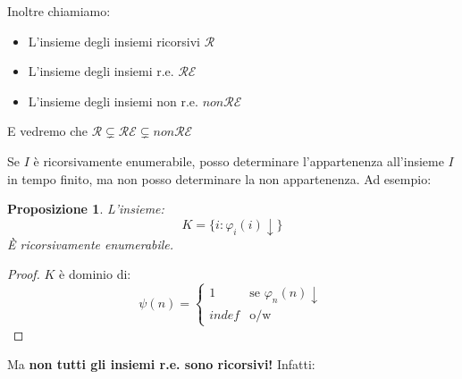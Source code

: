 \documentclass[a4paper,10pt,oneside]{article}
\theoremstyle{break}
\newtheorem{prop}{Proposizione}[subsection]
\newcommand{\RE}{\mathcal {RE}}
\newcommand{\R}{\mathcal {R}}
\begin{document}
Inoltre chiamiamo:
\begin{multicols}{2}

\begin{itemize}
 \item L'insieme degli insiemi ricorsivi $\R$
 \item L'insieme degli insiemi r.e. $\RE$
 \item L'insieme degli insiemi non r.e. $non\RE$
\end{itemize}
E vedremo che $\R \subsetneq \RE \subsetneq non\RE$
\end{multicols}


Se $I$ è ricorsivamente enumerabile, posso determinare l'appartenenza all'insieme $I$ in tempo finito, ma non posso determinare la non appartenenza. Ad esempio:
\begin{mdframed}

\begin{prop}
\label{K}
L'insieme:
\[ K = \{ i : \varphi_i(i) \downarrow\} \]
È ricorsivamente enumerabile.
\end{prop}

\dotfill

\begin{proof}
 $K$ è dominio di:
 \[\psi(n) = \begin{cases}
              1 & \text{se } \varphi_n(n)\downarrow\\
              indef & \text{o/w}
             \end{cases}
\]
\end{proof}

\end{mdframed}

Ma \textbf{non tutti gli insiemi r.e. sono ricorsivi!} Infatti:
\end{document}
